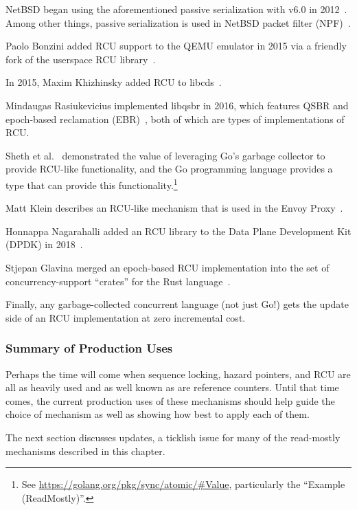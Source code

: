 NetBSD began using the aforementioned passive serialization with v6.0 in
2012~\cite{NetBSD2012pserialize}.
Among other things, passive serialization is used in
NetBSD packet filter (NPF)~\cite{MindaugasRasiukevicius2014NPFRCU}.

Paolo Bonzini added RCU support to the QEMU emulator in 2015 via a
friendly fork of the userspace RCU
library~\cite{MikeDay2013RCUqemu,PaoloBonzini2013QEMURCU}.

In 2015, Maxim Khizhinsky added RCU to
libcds~\cite{MaxKhiszinsky2015C++RCU}.

Mindaugas Rasiukevicius implemented libqsbr in 2016, which features
QSBR and epoch-based reclamation
(EBR)~\cite{MindaugasRasiukevicius2016libqsbr},
both of which are types of implementations of RCU\@.

Sheth et al.~\cite{HarshalSheth2016goRCU}
demonstrated the value of leveraging Go's garbage
collector to provide RCU-like functionality, and
the Go programming language provides a  type that can
provide this functionality.\footnote{
	See \url{https://golang.org/pkg/sync/atomic/\#Value}, particularly
	the ``Example (ReadMostly)''.}

Matt Klein describes an RCU-like mechanism that is used in the Envoy
Proxy~\cite{MattKlein2017EnvoyRCU}.

Honnappa Nagarahalli added an RCU library to the Data Plane Development
Kit (DPDK) in 2018~\cite{HonnappaNagarahalli2018dpdkRCU}.

Stjepan Glavina merged an epoch-based RCU implementation into the
 set of concurrency-support ``crates'' for the Rust
language~\cite{StjepanGlavina2018RustRCU}.

Finally, any garbage-collected concurrent language (not just Go!) gets
the update side of an RCU implementation at zero incremental cost.

\subsubsection{Summary of Production Uses}
\label{sec:defer:Summary of Production Uses}

Perhaps the time will come when sequence locking, hazard pointers, and
RCU are all as heavily used and as well known as are reference counters.
Until that time comes, the current production uses of these mechanisms
should help guide the choice of mechanism as well as showing how best
to apply each of them.

The next section discusses updates, a ticklish issue for many of the
read-mostly mechanisms described in this chapter.
